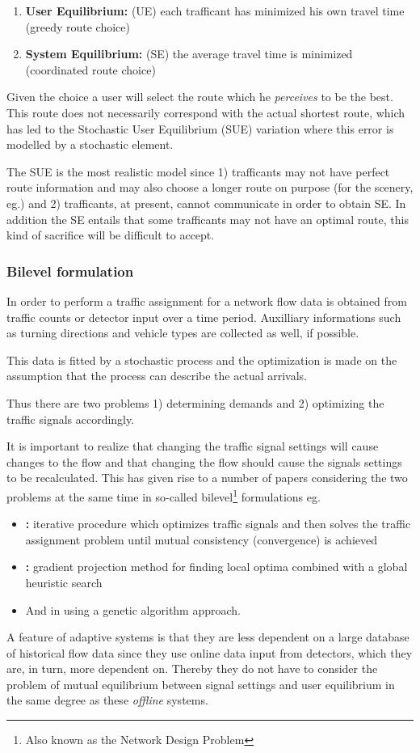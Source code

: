 \begin{enumerate}
\item \textbf{User Equilibrium:} (UE) each trafficant has minimized his own travel time (greedy route choice)
\item \textbf{System Equilibrium:} (SE) the average travel time is minimized (coordinated route choice)
\end{enumerate}

Given the choice a user will select the route which he \textit{perceives} to be the best. This route does not necessarily correspond with the actual shortest route, which has led to the Stochastic User Equilibrium (SUE) variation \cite{32} where this error is modelled by a stochastic element. 

The SUE is the most realistic model since 1) trafficants may not have perfect route information and may also choose a longer route on purpose (for the scenery, eg.) and 2) trafficants, at present, cannot communicate in order to obtain SE. In addition the SE entails that some trafficants may not have an optimal route, this kind of sacrifice will be difficult to accept.

\subsubsection*{Bilevel formulation}
\label{bilevel}
In order to perform a traffic assignment for a network flow data is obtained from traffic counts or detector input over a time period. Auxilliary informations such as turning directions and vehicle types are collected as well, if possible. 

This data is fitted by a stochastic process and the optimization is made on the assumption that the process can describe the actual arrivals.

Thus there are two problems 1) determining demands and 2) optimizing the traffic signals accordingly.

It is important to realize that changing the traffic signal settings will cause changes to the flow and that changing the flow should cause the signals settings to be recalculated. This has given rise to a number of papers considering the two problems at the same time in so-called bilevel\footnote{Also known as the Network Design Problem} formulations eg. 
\begin{itemize}
\item \textbf{\cite{mc}:} iterative procedure which optimizes traffic signals and then solves the traffic assignment problem until mutual consistency (convergence) is achieved
\item \textbf{\cite{34}:} gradient projection method for finding local optima combined with a global heuristic search
\item And in \textbf{\cite{2}} using a genetic algorithm approach.
\end{itemize}

A feature of adaptive systems is that they are less dependent on a large database of historical flow data since they use online data input from detectors, which they are, in turn, more dependent on. Thereby they do not have to consider the problem of mutual equilibrium between signal settings and user equilibrium in the same degree as these \textit{offline} systems.